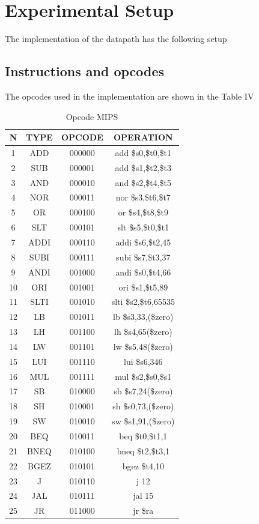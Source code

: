 \documentclass[conference]{IEEEtran}
\begin{document}
\section{Experimental Setup} %
The implementation of the datapath has the following setup
\subsection{Instructions and opcodes}
The opcodes used in the implementation are shown in the Table IV
\begin{table}[htbp]
	\caption{Opcode MIPS} %
	\begin{center}
		\begin{tabular}{|c|c|c|c|}
			\hline
			N&TYPE&OPCODE&OPERATION\\
			\hline
			1&ADD&000000&add \$s0,\$t0,\$t1\\
			\hline
			2&SUB&000001&add \$s1,\$t2,\$t3\\
			\hline
			3&AND&000010&and \$s2,\$t4,\$t5\\
			\hline
			4&NOR&000011&nor \$s3,\$t6,\$t7\\
			\hline
			5&OR&000100&or \$s4,\$t8,\$t9\\
			\hline
			6&SLT&000101&slt \$s5,\$t0,\$t1\\
			\hline
			7&ADDI&000110&addi \$s6,\$t2,45\\
			\hline
			8&SUBI&000111&subi \$s7,\$t3,37\\
			\hline
			9&ANDI&001000&andi \$s0,\$t4,66\\
			\hline
			10&ORI&001001&ori \$s1,\$t5,89\\
			\hline
			11&SLTI&001010&slti \$s2,\$t6,65535\\
			\hline
			12&LB&001011&lb \$s3,33,(\$zero)\\
			\hline
			13&LH&001100&lh \$s4,65(\$zero)\\
			\hline
			14&LW&001101&lw \$s5,48(\$zero)\\
			\hline
			15&LUI&001110&lui \$s6,346\\
			\hline
			16&MUL&001111&mul \$s2,\$s0,\$s1\\
			\hline
			17&SB&010000&sb \$s7,24(\$zero)\\
			\hline
			18&SH&010001&sh \$s0,73,(\$zero)\\
			\hline
			19&SW&010010&sw \$s1,91,(\$zero)\\
			\hline
			20&BEQ&010011&beq \$t0,\$t1,1\\
			\hline
			21&BNEQ&010100&bneq \$t2,\$t3,1\\
			\hline
			22&BGEZ&010101&bgez \$t4,10\\
			\hline
			23&J&010110&j 12\\
			\hline
			24&JAL&010111&jal 15\\
			\hline
			25&JR&011000&jr \$ra\\
			\hline
		\end{tabular}
	\label{tab_opcode}
\end{center}
\end{table}
\end{document}
